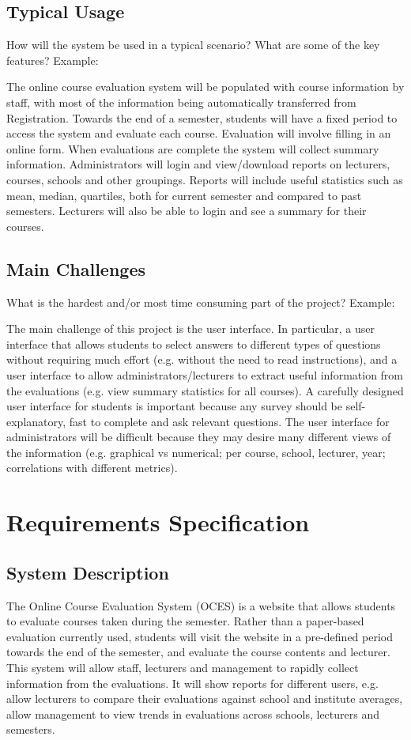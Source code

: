 \documentclass[12pt, a4paper]{report}
\begin{document}
\section{Typical Usage}
\label{sec:usage}
How will the system be used in a typical scenario? What are some of the key features? Example:

The online course evaluation system will be populated with course information by staff, with most of the information being automatically transferred from Registration. Towards the end of a semester, students will have a fixed period to access the system and evaluate each course. Evaluation will involve filling in an online form. When evaluations are complete the system will collect summary information. Administrators will login and view/download reports on lecturers, courses, schools and other groupings. Reports will include useful statistics such as mean, median, quartiles, both for current semester and compared to past semesters. Lecturers will also be able to login and see a summary for their courses.


\section{Main Challenges}
\label{sec:challenges}

What is  the hardest and/or most time consuming part of the project? Example:

The main challenge of this project is the user interface. In particular, a user interface that allows students to select answers to different types of questions without requiring much effort (e.g. without the need to read instructions), and a user interface to allow administrators/lecturers to extract useful information from the evaluations (e.g. view summary statistics for all courses). A carefully designed user interface for students is important because any survey should be self-explanatory, fast to complete and ask relevant questions. The user interface for administrators will be difficult because they may desire many different views of the information (e.g. graphical vs numerical; per course, school, lecturer, year; correlations with different metrics).


\chapter{Requirements Specification}

\section{System Description}
The Online Course Evaluation System (OCES) is a website that allows students to evaluate courses taken during the semester. Rather than a paper-based evaluation currently used, students will visit the website in a pre-defined period towards the end of the semester, and evaluate the course contents and lecturer. This system will allow staff, lecturers and management to rapidly collect information from the evaluations. It will show reports for different users, e.g. allow lecturers to compare their evaluations against school and institute averages, allow management to view trends in evaluations across schools, lecturers and semesters.
\end{document}
